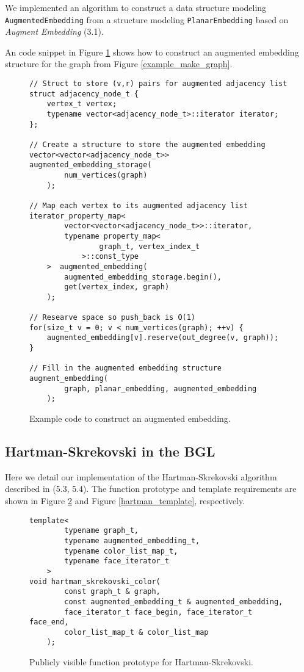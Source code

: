 \documentclass[letterpaper, 12pt]{article}
\theoremstyle{definition}
\theoremstyle{definition}
\theoremstyle{thm}
\theoremstyle{definition}
\begin{document}
We implemented an algorithm to construct a data structure modeling \texttt{AugmentedEmbedding}
from a structure modeling \texttt{PlanarEmbedding} based on \textit{Augment
Embedding} (3.1).

An code snippet in Figure \ref{example_augment_embedding} shows how to
construct an augmented embedding structure for the graph from Figure
\ref{example_make_graph}.

\begin{figure}
\begin{lstlisting}[frame=single]
// Struct to store (v,r) pairs for augmented adjacency list
struct adjacency_node_t {
    vertex_t vertex;
    typename vector<adjacency_node_t>::iterator iterator;
};

// Create a structure to store the augmented embedding
vector<vector<adjacency_node_t>> augmented_embedding_storage(
        num_vertices(graph)
    );

// Map each vertex to its augmented adjacency list
iterator_property_map<
        vector<vector<adjacency_node_t>>::iterator,
        typename property_map<
                graph_t, vertex_index_t
            >::const_type
    >  augmented_embedding(
        augmented_embedding_storage.begin(),
        get(vertex_index, graph)
    );

// Researve space so push_back is O(1)
for(size_t v = 0; v < num_vertices(graph); ++v) {
    augmented_embedding[v].reserve(out_degree(v, graph));
}

// Fill in the augmented embedding structure
augment_embedding(
        graph, planar_embedding, augmented_embedding
    );
\end{lstlisting}
\caption{Example code to construct an augmented embedding.}
\label{example_augment_embedding}
\end{figure}

\subsection{Hartman-Skrekovski in the BGL}

Here we detail our implementation of the Hartman-Skrekovski algorithm described
in (5.3, 5.4). The
function prototype and template requirements are shown
in Figure \ref{hartman_prototype} and Figure \ref{hartman_template},
respectively.

\begin{figure}
\begin{lstlisting}[frame=single]
template<
        typename graph_t,
        typename augmented_embedding_t,
        typename color_list_map_t,
        typename face_iterator_t
    >
void hartman_skrekovski_color(
        const graph_t & graph,
        const augmented_embedding_t & augmented_embedding,
        face_iterator_t face_begin, face_iterator_t face_end,
        color_list_map_t & color_list_map
    );
\end{lstlisting}
\caption{Publicly visible function prototype for Hartman-Skrekovski.}
\label{hartman_prototype}
\end{figure}
\end{document}
